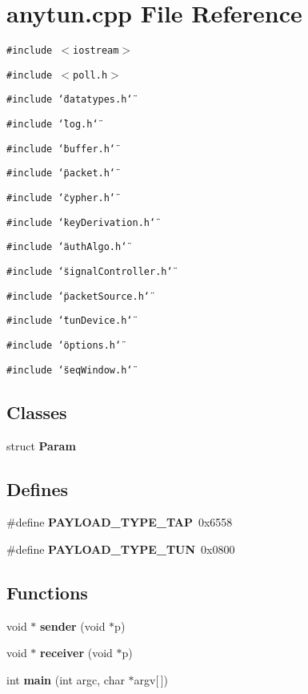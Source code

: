 \section{anytun.cpp File Reference}
\label{anytun_8cpp}
{\tt \#include $<$iostream$>$}\par
{\tt \#include $<$poll.h$>$}\par
{\tt \#include \char`\"{}datatypes.h\char`\"{}}\par
{\tt \#include \char`\"{}log.h\char`\"{}}\par
{\tt \#include \char`\"{}buffer.h\char`\"{}}\par
{\tt \#include \char`\"{}packet.h\char`\"{}}\par
{\tt \#include \char`\"{}cypher.h\char`\"{}}\par
{\tt \#include \char`\"{}key\-Derivation.h\char`\"{}}\par
{\tt \#include \char`\"{}auth\-Algo.h\char`\"{}}\par
{\tt \#include \char`\"{}signal\-Controller.h\char`\"{}}\par
{\tt \#include \char`\"{}packet\-Source.h\char`\"{}}\par
{\tt \#include \char`\"{}tun\-Device.h\char`\"{}}\par
{\tt \#include \char`\"{}options.h\char`\"{}}\par
{\tt \#include \char`\"{}seq\-Window.h\char`\"{}}\par
\subsection*{Classes}
\begin{CompactItemize}
\item 
struct {\bf Param}
\end{CompactItemize}
\subsection*{Defines}
\begin{CompactItemize}
\item 
\#define {\bf PAYLOAD\_\-TYPE\_\-TAP}~0x6558
\item 
\#define {\bf PAYLOAD\_\-TYPE\_\-TUN}~0x0800
\end{CompactItemize}
\subsection*{Functions}
\begin{CompactItemize}
\item 
void $\ast$ {\bf sender} (void $\ast$p)
\item 
void $\ast$ {\bf receiver} (void $\ast$p)
\item 
int {\bf main} (int argc, char $\ast$argv[$\,$])
\end{CompactItemize}


